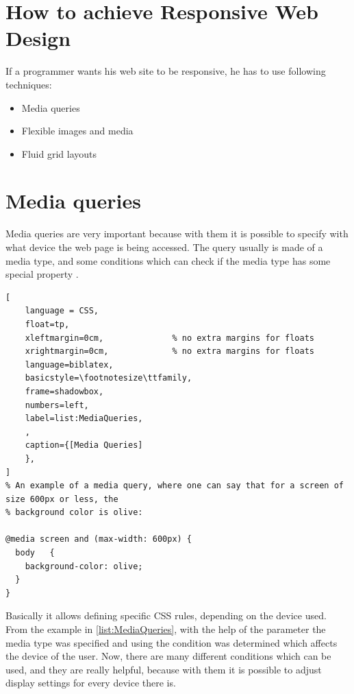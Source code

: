   



\section{How to achieve Responsive Web Design}

If a programmer wants his web site to be responsive, he has to use
following techniques:

\begin{itemize}
    \item Media queries
    \item Flexible images and media
    \item Fluid grid layouts
\end{itemize}


\section{Media queries}

Media queries are very important because with them it is possible to
specify with what device the web page is being accessed. The query
usually is made of a media type, and some conditions which can check if
the media type has some special property \parencite{A.A.Mohamed}.



\begin{lstlisting}[
    language = CSS, 
    float=tp,
    xleftmargin=0cm,              % no extra margins for floats
    xrightmargin=0cm,             % no extra margins for floats
    language=biblatex,
    basicstyle=\footnotesize\ttfamily,
    frame=shadowbox,
    numbers=left,
    label=list:MediaQueries,
    ,
    caption={[Media Queries]
    },
]
% An example of a media query, where one can say that for a screen of size 600px or less, the 
% background color is olive:

@media screen and (max-width: 600px) {
  body   {
    background-color: olive;
  }
}
\end{lstlisting}



Basically it allows defining specific CSS rules, depending on the device
used. From the example in \ref{list:MediaQueries}, with the help of the parameter
 the media type was specified and using 
the condition was determined which affects the device of the user. Now,
there are many different conditions which can be used, and they are
really helpful, because with them it is possible to adjust display
settings for every device there is.

